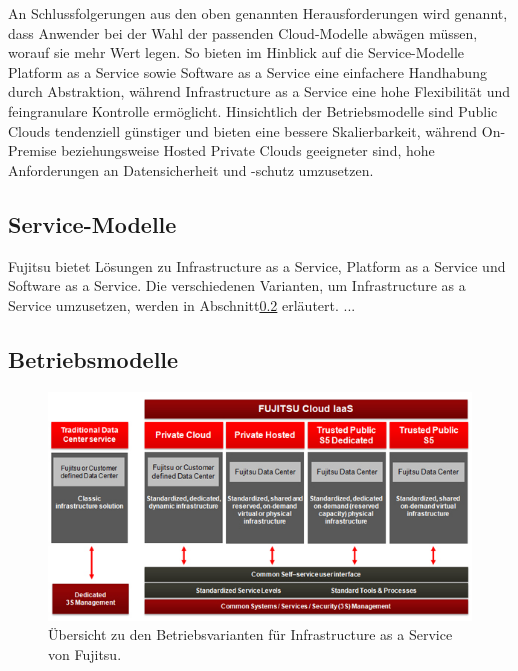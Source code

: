 
An Schlussfolgerungen aus den oben genannten Herausforderungen wird genannt, dass Anwender bei der Wahl der passenden Cloud-Modelle abwägen müssen, worauf sie mehr Wert legen. 
So bieten im Hinblick auf die Service-Modelle Platform as a Service sowie Software as a Service eine einfachere Handhabung durch Abstraktion, während Infrastructure as a Service eine hohe Flexibilität und feingranulare Kontrolle ermöglicht. 
Hinsichtlich der Betriebsmodelle sind Public Clouds tendenziell günstiger und bieten eine bessere Skalierbarkeit, während On-Premise beziehungsweise Hosted Private Clouds geeigneter sind, hohe Anforderungen an Datensicherheit und -schutz umzusetzen.

\subsection{Service-Modelle}
\label{sec_fujitsu_delivery}

Fujitsu bietet Lösungen zu Infrastructure as a Service, Platform as a Service und Software as a Service. 
Die verschiedenen Varianten, um Infrastructure as a Service umzusetzen, werden in Abschnitt\ref{sec_fujitsu_deployment} erläutert.
...

\subsection{Betriebsmodelle}
\label{sec_fujitsu_deployment}


\begin{figure}
	\centering
	\includegraphics[width=0.8\linewidth]{images/fujitsuModels}
	\caption{Übersicht zu den Betriebsvarianten für Infrastructure as a Service von Fujitsu. \cite{fujitsuIaaS}}
	\label{fig:fujitsuModels}
\end{figure}

